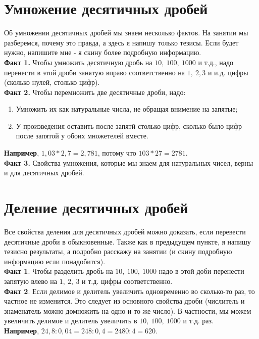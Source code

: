 \documentclass{article}
\begin{document}
\section{Умножение десятичных дробей}
Об умножении десятичных дробей мы знаем несколько фактов. На занятии мы разберемся, почему это правда, а здесь я напишу только тезисы. Если будет нужно, напишите мне - я скину более подробную информацию.\\

\textbf{Факт 1.} Чтобы умножить десятичную дробь на $10,~ 100,~ 1000$ и т.д., надо перенести в этой дроби занятую вправо соответственно на $1,~2,3$ и и.д. цифры (сколько нулей, столько цифр).\\

\textbf{Факт 2.} Чтобы перемножить две десятичные дроби, надо: 
\begin{enumerate}
    \item Умножить их как натуральные числа, не обращая внимение на запятые;
    \item У произведения оставить после запятй столько цифр, сколько было цифр после запятой у обоих множетелей вместе.
\end{enumerate}
\textbf{Например}, $1,03*2,7 = 2,781$, потому что $103*27 = 2781$.\\

\textbf{Факт 3.} Свойства умножения, которые мы знаем для натуральных чисел, верны и для десятичных дробей.

\section{Деление десятичных дробей}
Все свойства деления для десятичных дробей можно доказать, если перевести десятичные дроби в обыкновенные. Также как в предыдущем пункте, я напишу тезисно результаты, а подробно расскажу на занятии (и скину подробную информацию если понадобится).\\

\textbf{Факт 1}. Чтобы разделить дробь на $10,~ 100,~ 1000$ надо в этой доби перенести запятую влево на $1,~2,~3$ и т.д. цифры соответственно.\\

\textbf{Факт 2}. Если делимое и делитель увеличить одновременно во сколько-то раз, то частное не изменится. Это следует из основного свойства дроби (числитель и знаменатель можно домножить на одно и то же число). В частности, мы можем увеличить делимое и делитель увеличить в $10,~100,~1000$ и т.д. раз.\\
\textbf{Например}, $24,8 : 0,04 = 248 : 0,4 = 2480 : 4 = 620$.\\
\end{document}
